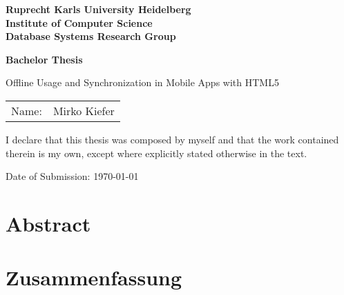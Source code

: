 \documentclass[
     12pt,         %
     a4paper,      %
     BCOR10mm,     %
     DIV14,        %
     liststotoc,   %
     bibtotoc,     %
     idxtotoc,     %
     ]{scrreprt}
\begin{document}
\begin{titlepage}


\vspace*{1cm}
\begin{center}
\vspace*{3cm}
\textbf{ 
\Large Ruprecht Karls University Heidelberg\\
\smallskip
\Large Institute of Computer Science\\
\smallskip
\Large Database Systems Research Group\\
\smallskip
}

\vspace{3cm}

\textbf{\large Bachelor Thesis} %

\vspace{0.5\baselineskip}
{\huge
Offline Usage and Synchronization in Mobile Apps with HTML5
}
\end{center}

\vfill 

{\large
\begin{tabular}[l]{ll}
Name: & Mirko Kiefer\\
\end{tabular}
}

\end{titlepage}

\onehalfspacing

\thispagestyle{empty}

\vspace*{100pt}
I declare that this thesis was composed by myself and that the work contained therein is my
own, except where explicitly stated otherwise in the text.

\vspace*{50pt}


Date of Submission: \today
\newpage

\chapter*{Abstract}

\newpage

\chapter*{Zusammenfassung}

\newpage
\end{document}
